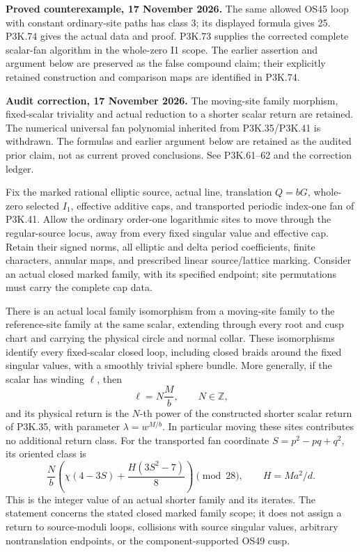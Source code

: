 \begin{theorem}\label{night:P3K.43}
\par\noindent\textbf{Proved counterexample, 17 November 2026.} The same allowed OS45 loop with constant ordinary-site paths has class 3; its displayed formula gives 25. P3K.74 gives the actual data and proof. P3K.73 supplies the corrected complete scalar-fan algorithm in the whole-zero I1 scope. The earlier assertion and argument below are preserved as the false compound claim; their explicitly retained construction and comparison maps are identified in P3K.74.

\par\noindent\textbf{Audit correction, 17 November 2026.} The moving-site family morphism, fixed-scalar triviality and actual reduction to a shorter scalar return are retained. The numerical universal fan polynomial inherited from P3K.35/P3K.41 is withdrawn. The formulas and earlier argument below are retained as the audited prior claim, not as current proved conclusions. See P3K.61--62 and the correction ledger.
\medskip


Fix the marked rational elliptic source, actual line, translation
\(Q=bG\), whole-zero selected \(I_1\), effective additive caps,
and transported periodic index-one fan of P3K.41. Allow the ordinary
order-one logarithmic sites to move through the regular-source locus,
away from every fixed singular value and effective cap. Retain their
signed norms, all elliptic and delta period coefficients, finite
characters, annular maps, and prescribed linear source/lattice marking.
Consider an actual closed marked family, with its specified endpoint;
site permutations must carry the complete cap data.

There is an actual local family isomorphism from a moving-site family
to the reference-site family at the same scalar, extending through every
root and cusp chart and carrying the physical circle and normal collar.
These isomorphisms identify every fixed-scalar closed loop, including
closed braids around the fixed singular values, with a smoothly trivial
sphere bundle. More generally, if the scalar has winding \(\ell\),
then
\[
                    \ell=N\frac{M}{b},\qquad N\in\mathbb Z,
\]
and its physical return is the \(N\)-th power of the constructed
shorter scalar return of P3K.35, with parameter
\(\lambda=w^{M/b}\). In particular moving these sites contributes
no additional return class. For the transported fan coordinate
\(S=p^2-pq+q^2\), its oriented class is
\[
 \frac{N}{b}\left(\chi(4-3S)+\frac{H(3S^2-7)}8\right)
             \pmod {28},\qquad H=Ma^2/d.
\]
This is the integer value of an actual shorter family and its iterates.
The statement concerns the stated closed marked family scope; it does
not assign a return to source-moduli loops, collisions with source
singular values, arbitrary nontranslation endpoints, or the
component-supported OS49 cusp.

\end{theorem}

